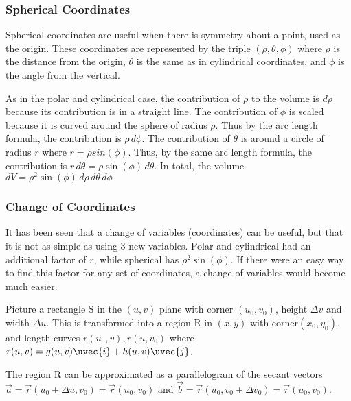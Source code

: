 \documentclass{notes}
\begin{document}
\subsubsection*{Spherical Coordinates}

Spherical coordinates are useful when there is symmetry about a point, used as the origin. These coordinates are represented by the triple \((\rho, \theta, \phi)\) where \(\rho\) is the distance from the origin, \(\theta\) is the same as in cylindrical coordinates, and \(\phi\) is the angle from the vertical.


As in the polar and cylindrical case, the contribution of \(\rho\) to the volume is \(d\rho\) because its contribution is in a straight line. The contribution of \(\phi\) is scaled because it is curved around the sphere of radius \(\rho\). Thus by the arc length formula, the contribution is \(\rho \,d\phi\). The contribution of \(\theta\) is around a circle of radius \(r\) where \(r = \rho sin(\phi)\). Thus, by the same arc length formula, the contribution is \(r \,d\theta = \rho \sin(\phi)\, d\theta\). In total, the volume \(dV = \rho^2 \sin(\phi) \,d\rho\,d\theta\,d\phi\)

\subsubsection*{Change of Coordinates}

It has been seen that a change of variables (coordinates) can be useful, but that it is not as simple as using 3 new variables. Polar and cylindrical had an additional factor of \(r\), while spherical has \(\rho^2 \sin(\phi)\). If there were an easy way to find this factor for any set of coordinates, a change of variables would become much easier.

Picture a rectangle S in the \((u, v)\) plane with corner \((u_0, v_0)\), height \(\Delta v\) and width \(\Delta u\). This is transformed into a region R in \((x, y)\) with corner\((x_0, y_0)\), and length curves \(r(u_0, v), r(u, v_0)\) where \(r(u, v) = g(u, v) \uvec{i} + h(u, v) \uvec{j}\).


The  region R can be approximated as a parallelogram of the secant vectors \(\vec{a} = \vec{r}(u_0 + \Delta u, v_0) = \vec{r}(u_0, v_0)\) and \(\vec{b} = \vec{r}(u_0, v_0 + \Delta v_0) = \vec{r}(u_0, v_0)\).
\end{document}
